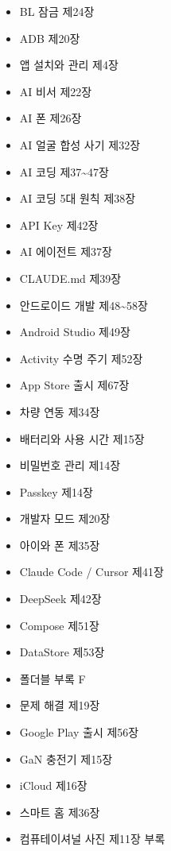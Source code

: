 


\begin{itemize}
  \item BL 잠금 제24장
  \item ADB 제20장
  \item 앱 설치와 관리 제4장
  \item AI 비서 제22장
  \item AI 폰 제26장
  \item AI 얼굴 합성 사기 제32장
  \item AI 코딩 제37\textasciitilde{}47장
  \item AI 코딩 5대 원칙 제38장
  \item API Key 제42장
  \item AI 에이전트 제37장
  \item CLAUDE.md 제39장
  \item 안드로이드 개발 제48\textasciitilde{}58장
  \item Android Studio 제49장
  \item Activity 수명 주기 제52장
  \item App Store 출시 제67장
\end{itemize}


\begin{itemize}
  \item 차량 연동 제34장
  \item 배터리와 사용 시간 제15장
  \item 비밀번호 관리 제14장
  \item Passkey 제14장
  \item 개발자 모드 제20장
  \item 아이와 폰 제35장
  \item Claude Code / Cursor 제41장
  \item DeepSeek 제42장
  \item Compose 제51장
  \item DataStore 제53장
\end{itemize}


\begin{itemize}
  \item 폴더블 부록 F
  \item 문제 해결 제19장
  \item Google Play 출시 제56장
  \item GaN 충전기 제15장
  \item iCloud 제16장
  \item 스마트 홈 제36장
  \item 컴퓨테이셔널 사진 제11장 부록
\end{itemize}

